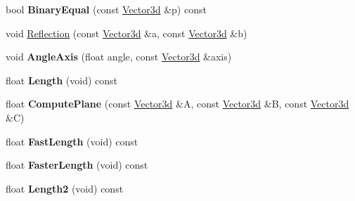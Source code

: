 \begin{DoxyCompactItemize}
\item 
\hypertarget{class_convex_decomposition_1_1_vector3d_a5684e5a319fc8c28808a0c188a9a0e8d}{bool {\bfseries Binary\+Equal} (const \hyperlink{class_convex_decomposition_1_1_vector3d}{Vector3d} \&p) const }\label{class_convex_decomposition_1_1_vector3d_a5684e5a319fc8c28808a0c188a9a0e8d}

\item 
void \hyperlink{class_convex_decomposition_1_1_vector3d_a6851e542fc960630b175957d132b7301}{Reflection} (const \hyperlink{class_convex_decomposition_1_1_vector3d}{Vector3d} \&a, const \hyperlink{class_convex_decomposition_1_1_vector3d}{Vector3d} \&b)
\item 
\hypertarget{class_convex_decomposition_1_1_vector3d_a1ef7f6a243a59ed96906698fa46d4e40}{void {\bfseries Angle\+Axis} (float angle, const \hyperlink{class_convex_decomposition_1_1_vector3d}{Vector3d} \&axis)}\label{class_convex_decomposition_1_1_vector3d_a1ef7f6a243a59ed96906698fa46d4e40}

\item 
\hypertarget{class_convex_decomposition_1_1_vector3d_a5338dd6c7739fde9522c017d3e362cd5}{float {\bfseries Length} (void) const }\label{class_convex_decomposition_1_1_vector3d_a5338dd6c7739fde9522c017d3e362cd5}

\item 
\hypertarget{class_convex_decomposition_1_1_vector3d_a699b4e6cbec84829ac6fdd6f16423654}{float {\bfseries Compute\+Plane} (const \hyperlink{class_convex_decomposition_1_1_vector3d}{Vector3d} \&A, const \hyperlink{class_convex_decomposition_1_1_vector3d}{Vector3d} \&B, const \hyperlink{class_convex_decomposition_1_1_vector3d}{Vector3d} \&C)}\label{class_convex_decomposition_1_1_vector3d_a699b4e6cbec84829ac6fdd6f16423654}

\item 
\hypertarget{class_convex_decomposition_1_1_vector3d_a938def6c9cad74d42b346a08b90ee4eb}{float {\bfseries Fast\+Length} (void) const }\label{class_convex_decomposition_1_1_vector3d_a938def6c9cad74d42b346a08b90ee4eb}

\item 
\hypertarget{class_convex_decomposition_1_1_vector3d_a1ea70eb8d7a2f8fcc3d98d7d4ed37751}{float {\bfseries Faster\+Length} (void) const }\label{class_convex_decomposition_1_1_vector3d_a1ea70eb8d7a2f8fcc3d98d7d4ed37751}

\item 
\hypertarget{class_convex_decomposition_1_1_vector3d_af887d06ae6cef3a9e76d4c7228581d18}{float {\bfseries Length2} (void) const }\label{class_convex_decomposition_1_1_vector3d_af887d06ae6cef3a9e76d4c7228581d18}


\end{DoxyCompactItemize}
